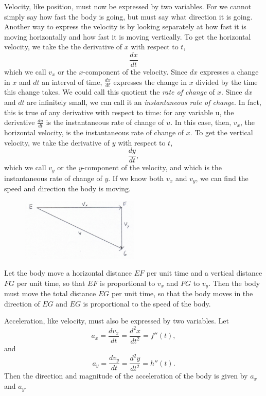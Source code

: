 \documentclass[polutonikogreek,english,twoside,openright]{article}
\begin{document}
Velocity, like position, must now be expressed by two variables.  For
we cannot simply say how fast the body is going, but must say what
direction it is going.  Another way to express the velocity is by
looking separately at how fast it is moving horizontally and how fast
it is moving vertically.  To get the horizontal velocity, we take the
the derivative of $x$ with respect to $t$,
$$\frac{dx}{dt}$$
which we call $v_x$ or the $x$-component of the velocity.  Since $dx$
expresses a change in $x$ and $dt$ an interval of time,
$\frac{dx}{dt}$ expresses the change in $x$ divided by the time this
change takes.  We could call this quotient the {\em rate of change} of
$x$.  Since $dx$ and $dt$ are infinitely small, we can call it an {\em
  instantaneous rate of change}.  In fact, this is true of any
derivative with respect to time: for any variable u, the derivative
$\frac{du}{dt}$ is the instantaneous rate of change of $u$.  In this
case, then, $v_x$, the horizontal velocity, is the instantaneous rate
of change of $x$.  To get the vertical velocity, we take the
derivative of $y$ with respect to $t$,
$$\frac{dy}{dt},$$
which we call $v_y$ or the $y$-component of the velocity, and which is
the instantaneous rate of change of $y$.  If we know both $v_x$ and
$v_y$, we can find the speed and direction the body is moving.
\begin{figure}[htp]
  \begin{center}
    \includegraphics[width=0.5\textwidth]{fig/Figure82}
    \caption{}
  \end{center}
\end{figure}
Let the body move a horizontal distance $EF$ per unit time and a
vertical distance $FG$ per unit time, so that $EF$ is proportional to
$v_x$ and $FG$ to $v_y$.  Then the body must move the total distance
$EG$ per unit time, so that the body moves in the direction of $EG$
and $EG$ is proportional to the speed of the body.

Acceleration, like velocity, must also be expressed by two variables.
Let
$$a_x = \frac{dv_x}{dt} = \frac{d^2x}{dt^2} = f''(t),$$
and
$$a_y = \frac{dv_y}{dt} = \frac{d^2y}{dt^2} = h''(t).$$
Then the direction and magnitude of the acceleration of the body is
given by $a_x$ and $a_y$.
\end{document}
